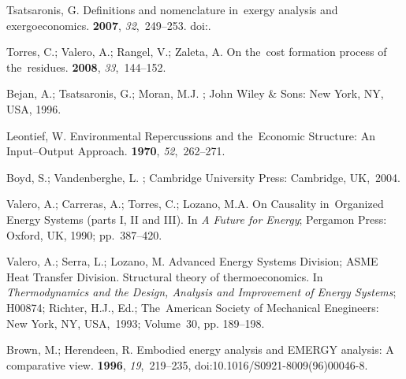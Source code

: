 \documentclass[energies,article,accept,moreauthors,pdftex]{Definitions/mdpi}
\begin{document}
\begin{thebibliography}{999}
	
	Tsatsaronis, G.
	\newblock Definitions and nomenclature in~exergy analysis and exergoeconomics.
	 {\bf 2007}, {\em 32},~249--253.
	doi:{\href{https://doi.org/https://doi.org/10.1016/j.energy.2006.07.002}{}}. 
	
	
	Torres, C.; Valero, A.; Rangel, V.; Zaleta, A.
	\newblock On the~cost formation process of the~residues.
	 {\bf 2008}, {\em 33},~144--152.
	
	
	Bejan, A.; Tsatsaronis, G.; Moran, M.J.
	;
	John Wiley \& Sons: New York, NY, USA, 1996.
	
	
	Leontief, W.
	\newblock Environmental {R}epercussions and the~{E}conomic {S}tructure: {A}n
	{I}nput--{O}utput {A}pproach.
	 {\bf 1970}, {\em
		52},~262--271.

	
	Boyd, S.; Vandenberghe, L.
	; Cambridge University Press: Cambridge, UK,~2004.

	
	Valero, A.; Carreras, A.; Torres, C.; Lozano, M.A.
	\newblock On {C}ausality in~{O}rganized {E}nergy {S}ystems (parts {I}, {II} and
	{III}).
	\newblock  In {\em A Future for Energy}; Pergamon Press: Oxford, UK, 1990; pp.~387--420.

	
	Valero, A.; Serra, L.; Lozano, M. Advanced Energy Systems Division; ASME Heat Transfer Division.
	\newblock Structural theory of thermoeconomics.
	\newblock  In {\em Thermodynamics and the Design, Analysis and Improvement of Energy Systems}; H00874; Richter, H.J., Ed.; The~American Society of
	Mechanical Enegineers: New York, NY, USA,~1993; Volume~30, pp. 189--198. 

	

	
	Brown, M.; Herendeen, R.
	\newblock Embodied energy analysis and EMERGY analysis: A comparative view.
	 {\bf 1996}, {\em 19},~219--235, doi:10.1016/S0921-8009(96)00046-8.


\end{thebibliography}
\end{document}
